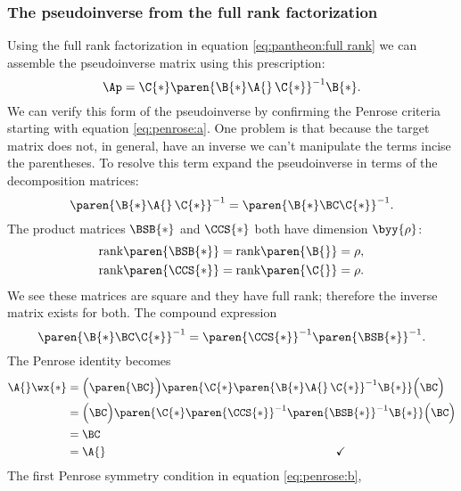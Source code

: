 \subsubsection{The pseudoinverse from the full rank factorization}
Using the full rank factorization in equation \eqref{eq:pantheon:full rank} we can assemble the pseudoinverse matrix using this prescription:
\begin{equation}
  \Ap = \C{*} \paren{\B{*}\A{}\,\C{*}}^{-1} \B{*} .
\end{equation}
We can verify this form of the pseudoinverse by confirming the Penrose criteria starting with equation \eqref{eq:penrose:a}. One problem is that because the target matrix does not, in general, have an inverse we can't manipulate the terms incise the parentheses. To resolve this term expand the pseudoinverse in terms of the decomposition matrices:
\begin{equation}
  \paren{\B{*}\A{}\,\C{*}}^{-1} = \paren{\B{*}\BC\C{*}}^{-1}.
\end{equation}
The product matrices $\BSB{*}$ and $\CCS{*}$ both have dimension $\byy{\rho}$:
\begin{equation}
  \begin{split}
    \text{rank} \paren{\BSB{*}} = \text{rank} \paren{\B{}} &= \rho , \\
    \text{rank} \paren{\CCS{*}} = \text{rank} \paren{\C{}} &= \rho .
  \end{split}
\end{equation}
We see these matrices are square and they have full rank; therefore the inverse matrix exists for both. The compound expression
\begin{equation}
  \paren{\B{*}\BC\C{*}}^{-1} = \paren{\CCS{*}}^{-1} \paren{\BSB{*}}^{-1}.
\end{equation}
The Penrose identity becomes
\begin{equation}
  \begin{split}
    \A{}\wx{*} 
      &= \Bigl( \paren{\BC}  \Bigr) \paren{\C{*} \paren{\B{*}\A{}\,\C{*}}^{-1} \B{*}} \Bigl( \BC \Bigr) \\
      &= \Bigl( \BC \Bigr) \paren{\C{*} \paren{\CCS{*}}^{-1} \paren{\BSB{*}}^{-1}  \B{*}} \Bigl( \BC \Bigr) \\
      &= \BC \\
      &= \A{} \qquad \qquad \qquad \qquad \qquad \qquad \qquad \qquad \qquad \qquad \checkmark
  \end{split}
\end{equation}
The first Penrose symmetry condition in equation \eqref{eq:penrose:b},
